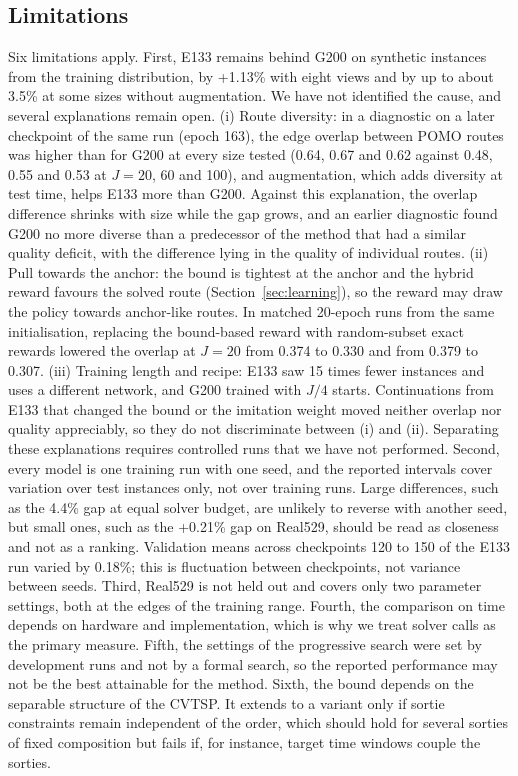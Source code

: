 \documentclass[preprint,12pt,authoryear]{elsarticle}
\begin{document}
\subsection{Limitations}
\label{sec:limits}

Six limitations apply. First, E133 remains behind G200 on synthetic instances from the training distribution, by +1.13\% with eight views and by up to about 3.5\% at some sizes without augmentation. We have not identified the cause, and several explanations remain open. (i) Route diversity: in a diagnostic on a later checkpoint of the same run (epoch 163), the edge overlap between POMO routes was higher than for G200 at every size tested (0.64, 0.67 and 0.62 against 0.48, 0.55 and 0.53 at $J = 20$, 60 and 100), and augmentation, which adds diversity at test time, helps E133 more than G200. Against this explanation, the overlap difference shrinks with size while the gap grows, and an earlier diagnostic found G200 no more diverse than a predecessor of the method that had a similar quality deficit, with the difference lying in the quality of individual routes. (ii) Pull towards the anchor: the bound is tightest at the anchor and the hybrid reward favours the solved route (Section~\ref{sec:learning}), so the reward may draw the policy towards anchor-like routes. In matched 20-epoch runs from the same initialisation, replacing the bound-based reward with random-subset exact rewards lowered the overlap at $J = 20$ from 0.374 to 0.330 and from 0.379 to 0.307. (iii) Training length and recipe: E133 saw 15 times fewer instances and uses a different network, and G200 trained with $J/4$ starts. Continuations from E133 that changed the bound or the imitation weight moved neither overlap nor quality appreciably, so they do not discriminate between (i) and (ii). Separating these explanations requires controlled runs that we have not performed. Second, every model is one training run with one seed, and the reported intervals cover variation over test instances only, not over training runs. Large differences, such as the 4.4\% gap at equal solver budget, are unlikely to reverse with another seed, but small ones, such as the +0.21\% gap on Real529, should be read as closeness and not as a ranking. Validation means across checkpoints 120 to 150 of the E133 run varied by 0.18\%; this is fluctuation between checkpoints, not variance between seeds. Third, Real529 is not held out and covers only two parameter settings, both at the edges of the training range. Fourth, the comparison on time depends on hardware and implementation, which is why we treat solver calls as the primary measure. Fifth, the settings of the progressive search were set by development runs and not by a formal search, so the reported performance may not be the best attainable for the method. Sixth, the bound depends on the separable structure of the CVTSP. It extends to a variant only if sortie constraints remain independent of the order, which should hold for several sorties of fixed composition but fails if, for instance, target time windows couple the sorties.
\end{document}

